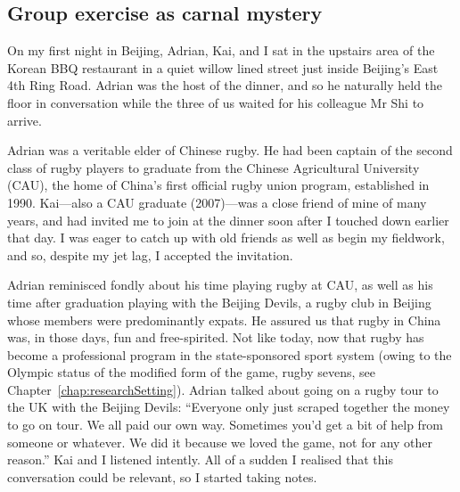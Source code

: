                                           \begin{CJK}{UTF8}{gbsn}

\section{Group exercise as carnal mystery\label{sect:adrian}}


On my first night in Beijing, Adrian, Kai, and I sat in the upstairs area of the Korean BBQ restaurant in a quiet willow lined street just inside Beijing's East 4th Ring Road.  Adrian was the host of the dinner, and so he naturally held the floor in conversation while the three of us waited for his colleague Mr Shi to arrive.

Adrian was a veritable elder of Chinese rugby.  He had been captain of the second class of rugby players to graduate from the Chinese Agricultural University (CAU), the home of China's first official rugby union program, established in 1990.  Kai---also a CAU graduate (2007)---was a close friend of mine of many years, and had invited me to join at the dinner soon after I touched down earlier that day.  I was eager to catch up with old friends as well as begin my fieldwork, and so, despite my jet lag, I accepted the invitation.

Adrian reminisced fondly about his time playing rugby at CAU, as well as his time after graduation playing with the Beijing Devils, a rugby club in Beijing whose members were predominantly expats.  He assured us that rugby in China was, in those days, fun and free-spirited.  Not like today, now that rugby has become a professional program in the state-sponsored sport system (owing to the Olympic status of the modified form of the game, rugby sevens, see Chapter~\ref{chap:researchSetting}).  Adrian talked about going on a rugby tour to the UK with the Beijing Devils:  ``Everyone only just scraped together the money to go on tour.  We all paid our own way. Sometimes you'd get a bit of help from someone or whatever. We did it because we loved the game, not for any other reason.''   Kai and I listened intently.  All of a sudden I realised that this conversation could be relevant, so I started taking notes.


\end{CJK}
